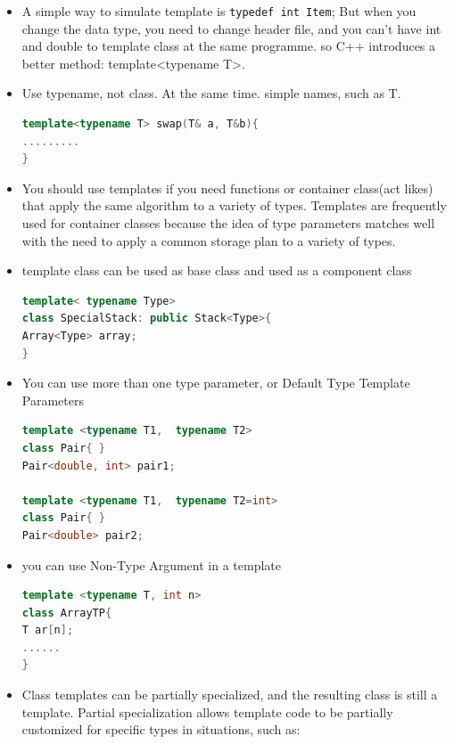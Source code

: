 \documentclass[a4paper,12pt,twoside]{book}
\begin{document}
\begin{itemize}

\item A simple way to simulate template is \verb=typedef int Item=; But when you change the data type, you need to change header file, and you can't have int and double to template class at the same programme. so C++ introduces a better method: template<typename T>.

\item Use typename, not class. At the same time. simple names, such as T.
\begin{lstlisting}[frame=single, language=c++]
template<typename T> swap(T& a, T&b){
.........
}
\end{lstlisting}

\item You should use templates if you need functions or container class(act likes) that apply the same algorithm to a variety of types. Templates are frequently used for container classes because the idea of type parameters matches well with the need to apply a common storage plan to a variety of types.

\item template class can be used as base class and used as a component class
\begin{lstlisting}[frame=single, language=c++]
template< typename Type>
class SpecialStack: public Stack<Type>{
Array<Type> array;
}
\end{lstlisting}


\item You can use more than one type parameter, or Default Type Template Parameters
\begin{lstlisting}[frame=single, language=c++]
template <typename T1,  typename T2>
class Pair{ }
Pair<double, int> pair1;

template <typename T1,  typename T2=int>
class Pair{ }
Pair<double> pair2;
\end{lstlisting}

\item you can use Non-Type Argument in a template
\begin{lstlisting}[frame=single, language=c++]
template <typename T, int n>
class ArrayTP{
T ar[n];
......
}
\end{lstlisting}

\item Class templates can be partially specialized, and the resulting class is still a template. Partial specialization allows template code to be partially customized for specific types in situations, such as:


\end{itemize}
\end{document}
